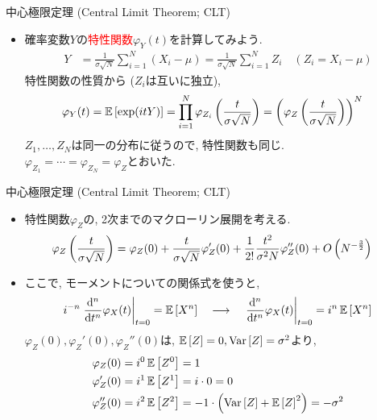 \documentclass[dvipdfmx,notheorems,t]{beamer}
\begin{document}
\begin{frame}{中心極限定理 (Central Limit Theorem; CLT)}
\begin{itemize}
  \item 確率変数$Y$の\textcolor{red}{特性関数}$\varphi_Y(t)$を計算してみよう.
  \begin{align*}
    Y &= \frac{1}{\sigma \sqrt{N}} \sum_{i = 1}^N \left( X_i - \mu \right)
      = \frac{1}{\sigma \sqrt{N}} \sum_{i = 1}^N Z_i \quad (Z_i = X_i - \mu)
  \end{align*}
  特性関数の性質から ($Z_i$は互いに独立),
  \begin{align*}
    \varphi_Y(t) &= \operatorname{\mathbb{E}} \left[ \exp(itY) \right]
      = \prod_{i = 1}^N \varphi_{Z_i} \left( \frac{t}{\sigma \sqrt{N}} \right)
      = \left( \varphi_Z \left( \frac{t}{\sigma \sqrt{N}} \right) \right)^N
  \end{align*}
  $Z_1, \ldots, Z_N$は同一の分布に従うので, 特性関数も同じ. \\
  $\varphi_{Z_1} = \cdots = \varphi_{Z_N} = \varphi_Z$とおいた.
\end{itemize}
\end{frame}

\begin{frame}{中心極限定理 (Central Limit Theorem; CLT)}
\begin{itemize}
  \item 特性関数$\varphi_Z$の, 2次までのマクローリン展開を考える.
  \begin{align*}
    \varphi_Z \left( \frac{t}{\sigma \sqrt{N}} \right)
      &= \varphi_Z(0) + \frac{t}{\sigma \sqrt{N}} \varphi_Z'(0)
        + \frac{1}{2!} \frac{t^2}{\sigma^2 N} \varphi_Z''(0) + O \left( N^{-\frac{3}{2}} \right)
  \end{align*}
  \item ここで, モーメントについての関係式を使うと,
  \begin{align*}
    i^{-n} \left. \dv[n]{t} \varphi_X(t) \right|_{t = 0} = \operatorname{\mathbb{E}} \left[ X^n \right] \quad \longrightarrow \quad
      \left. \dv[n]{t} \varphi_X(t) \right|_{t = 0} = i^n \operatorname{\mathbb{E}} \left[ X^n \right]
  \end{align*}
  $\varphi_Z(0), \varphi_Z'(0), \varphi_Z''(0)$は, $\operatorname{\mathbb{E}} \left[ Z \right] = 0, \operatorname{Var} \left[ Z \right] = \sigma^2$より,
  \begin{align*}
    \varphi_Z(0) &= i^0 \operatorname{\mathbb{E}} \left[ Z^0 \right] = 1 \\
    \varphi_Z'(0) &= i^1 \operatorname{\mathbb{E}} \left[ Z^1 \right] = i \cdot 0 = 0 \\
    \varphi_Z''(0) &= i^2 \operatorname{\mathbb{E}} \left[ Z^2 \right] = -1 \cdot \left( \operatorname{Var} \left[ Z \right] + \operatorname{\mathbb{E}} \left[ Z \right]^2 \right) = -\sigma^2
  \end{align*}
\end{itemize}
\end{frame}
\end{document}
